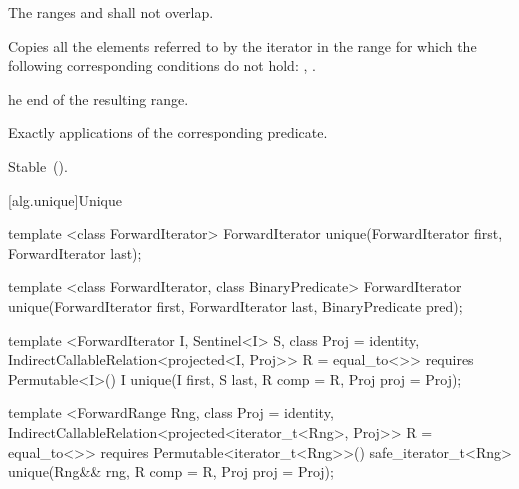 \begin{itemdescr}
\pnum
\requires
The ranges
and
shall not overlap.

\pnum
\effects
Copies all the elements referred to by the iterator
in the range
for which the following corresponding conditions do not hold:
,
.

\pnum
\returns
{}he end of the resulting range.

\pnum
\complexity
Exactly
applications of the corresponding predicate.

\pnum
\remarks Stable~().
\end{itemdescr}

[alg.unique]{Unique}

%
\begin{removedblock}
\begin{itemdecl}
template <class ForwardIterator>
  ForwardIterator unique(ForwardIterator first, ForwardIterator last);

template <class ForwardIterator, class BinaryPredicate>
  ForwardIterator unique(ForwardIterator first, ForwardIterator last,
                         BinaryPredicate pred);
\end{itemdecl}
\end{removedblock}
\begin{addedblock}
\begin{itemdecl}
template <ForwardIterator I, Sentinel<I> S, class Proj = identity,
    IndirectCallableRelation<projected<I, Proj>> R = equal_to<>>
  requires Permutable<I>()
  I unique(I first, S last, R comp = R{}, Proj proj = Proj{});

template <ForwardRange Rng, class Proj = identity,
    IndirectCallableRelation<projected<iterator_t<Rng>, Proj>> R = equal_to<>>
  requires Permutable<iterator_t<Rng>>()
  safe_iterator_t<Rng>
    unique(Rng&& rng, R comp = R{}, Proj proj = Proj{});
\end{itemdecl}
\end{addedblock}

